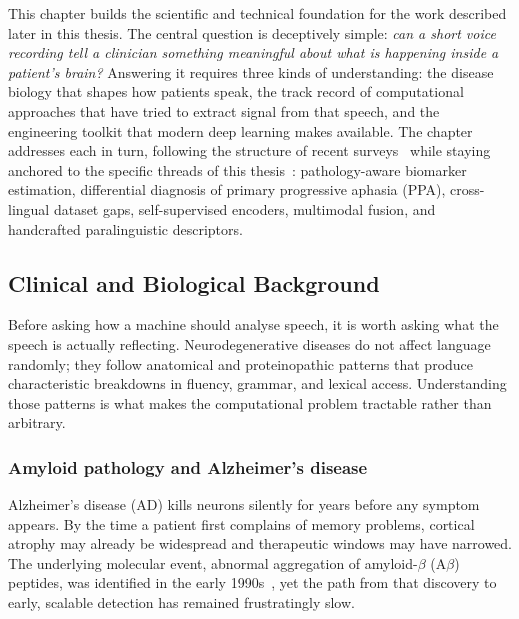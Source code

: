 This chapter builds the scientific and technical foundation for the work described later in this thesis.
The central question is deceptively simple: \emph{can a short voice recording tell a clinician something meaningful about what is happening inside a patient's brain?}
Answering it requires three kinds of understanding: the disease biology that shapes how patients speak, the track record of computational approaches that have tried to extract signal from that speech, and the engineering toolkit that modern deep learning makes available.
The chapter addresses each in turn, following the structure of recent surveys~\cite{ding2024speechsurvey} while staying anchored to the specific threads of this thesis~\cite{esteve2025speechadppa}: pathology-aware biomarker estimation, differential diagnosis of primary progressive aphasia (PPA), cross-lingual dataset gaps, self-supervised encoders, multimodal fusion, and handcrafted paralinguistic descriptors.

\subsection{Clinical and Biological Background}
\label{sec:sota_clinical}

Before asking how a machine should analyse speech, it is worth asking what the speech is actually reflecting.
Neurodegenerative diseases do not affect language randomly; they follow anatomical and proteinopathic patterns that produce characteristic breakdowns in fluency, grammar, and lexical access.
Understanding those patterns is what makes the computational problem tractable rather than arbitrary.

\subsubsection{Amyloid pathology and Alzheimer's disease}
\label{ssec:amyloid}

Alzheimer's disease (AD) kills neurons silently for years before any symptom appears.
By the time a patient first complains of memory problems, cortical atrophy may already be widespread and therapeutic windows may have narrowed.
The underlying molecular event, abnormal aggregation of amyloid-$\beta$ (A$\beta$) peptides, was identified in the early 1990s~\cite{hardy1992amyloid}, yet the path from that discovery to early, scalable detection has remained frustratingly slow.

